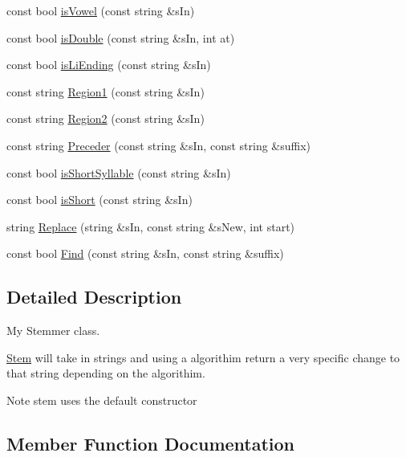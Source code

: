 \begin{DoxyCompactItemize}
\item 
const bool \hyperlink{class_stem_a56081e6af3591dd325b8a34dc1f6e0ab}{is\+Vowel} (const string \&s\+In)
\item 
const bool \hyperlink{class_stem_a0db7a87086d2fc5e88dcc5ccf5c15bde}{is\+Double} (const string \&s\+In, int at)
\item 
const bool \hyperlink{class_stem_ac0cf0f97ff0f65029061ee03bc366874}{is\+Li\+Ending} (const string \&s\+In)
\item 
const string \hyperlink{class_stem_aefe1ebdd09e2c9be6e70d986740f8a2f}{Region1} (const string \&s\+In)
\item 
const string \hyperlink{class_stem_a343616cfb550f5c192b4dbbb8f79789b}{Region2} (const string \&s\+In)
\item 
const string \hyperlink{class_stem_ac95ecce7610007cf1c4d27f504acbc00}{Preceder} (const string \&s\+In, const string \&suffix)
\item 
const bool \hyperlink{class_stem_a88f66ffd8b23e3da2e955888e802c780}{is\+Short\+Syllable} (const string \&s\+In)
\item 
const bool \hyperlink{class_stem_a709f4d5f630b10ef59025a5b3d738a17}{is\+Short} (const string \&s\+In)
\item 
string \hyperlink{class_stem_a3715bc3610477aaa57db94909717af84}{Replace} (string \&s\+In, const string \&s\+New, int start)
\item 
const bool \hyperlink{class_stem_a697fe82ce02b97fdeb9e4a6c458f4ec4}{Find} (const string \&s\+In, const string \&suffix)
\end{DoxyCompactItemize}


\subsection{Detailed Description}
My Stemmer class. 

\hyperlink{class_stem}{Stem} will take in strings and using a algorithim return a very specific change to that string depending on the algorithim. \begin{DoxyNote}{Note}
stem uses the default constructor 
\end{DoxyNote}


\subsection{Member Function Documentation}
\mbox{\label{class_stem_a697fe82ce02b97fdeb9e4a6c458f4ec4}} 
